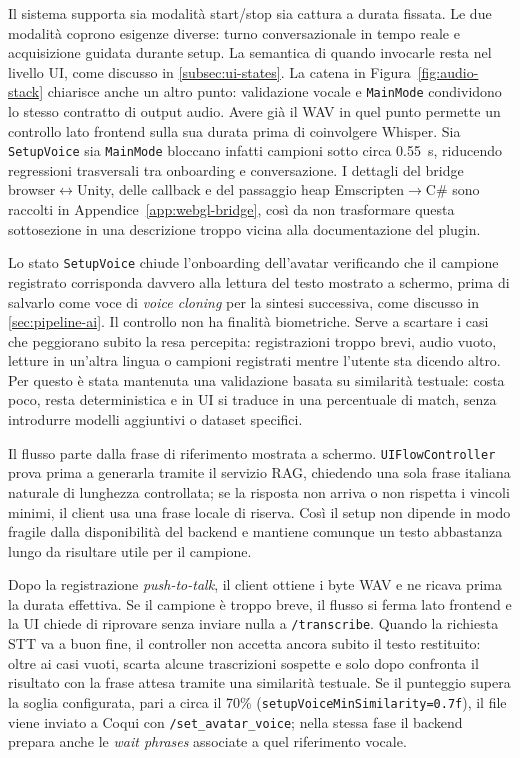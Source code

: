 Il sistema supporta sia modalità start/stop sia cattura a durata fissata. Le due modalità coprono esigenze diverse: turno conversazionale in tempo reale e acquisizione guidata durante setup. La semantica di quando invocarle resta nel livello UI, come discusso in \ref{subsec:ui-states}. La catena in Figura~\ref{fig:audio-stack} chiarisce anche un altro punto: validazione vocale e \texttt{MainMode} condividono lo stesso contratto di output audio. Avere già il WAV in quel punto permette un controllo lato frontend sulla sua durata prima di coinvolgere Whisper. Sia \texttt{SetupVoice} sia \texttt{MainMode} bloccano infatti campioni sotto circa \SI{0.55}{\second}, riducendo regressioni trasversali tra onboarding e conversazione. I dettagli del bridge browser$\leftrightarrow$Unity, delle callback e del passaggio heap Emscripten$\rightarrow$C\# sono raccolti in Appendice~\ref{app:webgl-bridge}, così da non trasformare questa sottosezione in una descrizione troppo vicina alla documentazione del plugin.

Lo stato \texttt{SetupVoice} chiude l'onboarding dell'avatar verificando che il campione registrato corrisponda davvero alla lettura del testo mostrato a schermo, prima di salvarlo come voce di \emph{voice cloning} per la sintesi successiva, come discusso in \autoref{sec:pipeline-ai}. Il controllo non ha finalità biometriche. Serve a scartare i casi che peggiorano subito la resa percepita: registrazioni troppo brevi, audio vuoto, letture in un'altra lingua o campioni registrati mentre l'utente sta dicendo altro. Per questo è stata mantenuta una validazione basata su similarità testuale: costa poco, resta deterministica e in UI si traduce in una percentuale di match, senza introdurre modelli aggiuntivi o dataset specifici.

Il flusso parte dalla frase di riferimento mostrata a schermo. \texttt{UIFlowController} prova prima a generarla tramite il servizio RAG, chiedendo una sola frase italiana naturale di lunghezza controllata; se la risposta non arriva o non rispetta i vincoli minimi, il client usa una frase locale di riserva. Così il setup non dipende in modo fragile dalla disponibilità del backend e mantiene comunque un testo abbastanza lungo da risultare utile per il campione.

Dopo la registrazione \emph{push-to-talk}, il client ottiene i byte WAV e ne ricava prima la durata effettiva. Se il campione è troppo breve, il flusso si ferma lato frontend e la UI chiede di riprovare senza inviare nulla a \texttt{/transcribe}. Quando la richiesta STT va a buon fine, il controller non accetta ancora subito il testo restituito: oltre ai casi vuoti, scarta alcune trascrizioni sospette e solo dopo confronta il risultato con la frase attesa tramite una similarità testuale. Se il punteggio supera la soglia configurata, pari a circa il 70\% (\texttt{setupVoiceMinSimilarity=0.7f}), il file viene inviato a Coqui con \texttt{/set_avatar_voice}; nella stessa fase il backend prepara anche le \emph{wait phrases} associate a quel riferimento vocale.\cite{Radford2023Whisper}

